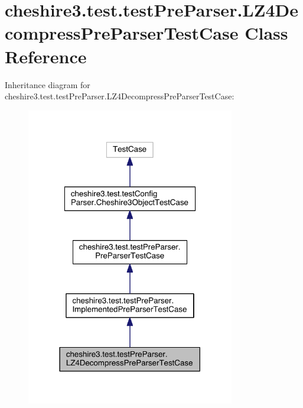 \hypertarget{classcheshire3_1_1test_1_1test_pre_parser_1_1_l_z4_decompress_pre_parser_test_case}{\section{cheshire3.\-test.\-test\-Pre\-Parser.\-L\-Z4\-Decompress\-Pre\-Parser\-Test\-Case Class Reference}
\label{classcheshire3_1_1test_1_1test_pre_parser_1_1_l_z4_decompress_pre_parser_test_case}
}


Inheritance diagram for cheshire3.\-test.\-test\-Pre\-Parser.\-L\-Z4\-Decompress\-Pre\-Parser\-Test\-Case\-:
\nopagebreak
\begin{figure}[H]
\begin{center}
\leavevmode
\includegraphics[width=258pt]{classcheshire3_1_1test_1_1test_pre_parser_1_1_l_z4_decompress_pre_parser_test_case__inherit__graph}
\end{center}
\end{figure}


